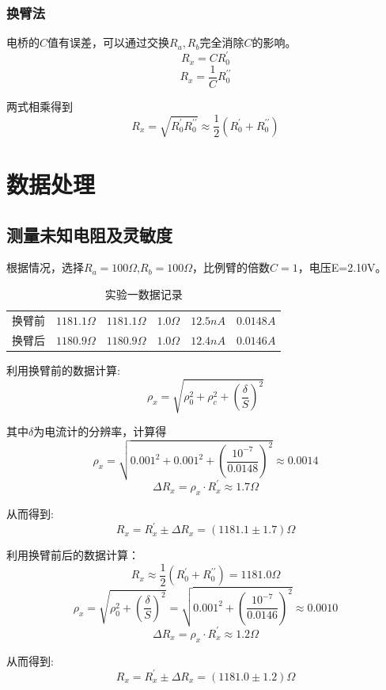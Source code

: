 \documentclass[12pt,a4paper]{article}
\begin{document}
	\subsubsection*{换臂法}
	\par 电桥的$C$值有误差，可以通过交换$R_a,R_b$完全消除$C$的影响。
	\[R_x=CR_0^{\prime}\]
	\[R_x=\frac{1}{C}R_0^{\prime\prime}\]
	\par 两式相乘得到
	$$R_x=\sqrt{R_0^{\prime}R_0^{\prime\prime}}\approx \frac{1}{2}(R_0^{\prime}+R_0^{\prime\prime})$$
	
	
	\section{数据处理}
	\subsection{测量未知电阻及灵敏度}
	\par 根据情况，选择$R_a=100\Omega$,$R_b=100\Omega$，比例臂的倍数$C=1$，电压E=2.10V。
	\begin{table}[!htbp]
		\renewcommand{\arraystretch}{1.5}
		\centering
		\caption{实验一数据记录}
		\begin{tabular}{cccccc}
			\toprule
			\makebox[0.18\textwidth][c]{电桥状态} & \makebox[0.13\textwidth][c]{$R_0$}& \makebox[0.13\textwidth][c]{$R_1$}& \makebox[0.13\textwidth][c]{$\Delta R_0$}& \makebox[0.13\textwidth][c]{$\Delta I$}& \makebox[0.13\textwidth][c]{$S_1$}\\
			\midrule
			换臂前& $1181.1\Omega$&  $1181.1\Omega$& $1.0\Omega$&$12.5nA$ & $0.0148A$\\
			换臂后& $1180.9\Omega$&  $1180.9\Omega$& $1.0\Omega$&$12.4nA$ & $0.0146A$\\
		\bottomrule		
		\end{tabular}
	\end{table}
	\clearpage
	\par 利用换臂前的数据计算:
	\[\rho_x=\sqrt{\rho_0^2+\rho_c^2+\left(\frac{\delta}{S}\right)^2}\]
	\par 其中$\delta$为电流计的分辨率，计算得
	\[\rho_x=\sqrt{0.001^2+0.001^2+\left(\frac{10^{-7}}{0.0148}\right)^2}\approx0.0014\]
	\[ \Delta R_x = \rho_x\cdot R_{x}^{\prime}\approx 1.7\Omega\]
	\par 从而得到:
	\[ R_x = R_{x}^{\prime}\pm \Delta R_x=(1181.1\pm 1.7) \Omega\]
	\par 利用换臂前后的数据计算：
	\[R_x\approx \frac{1}{2}(R_0^{\prime}+R_0^{\prime\prime})=1181.0\Omega\]
	\[\rho_x=\sqrt{\rho_0^2+\left(\frac{\delta}{S}\right)^2}=\sqrt{0.001^2+\left(\frac{10^{-7}}{0.0146}\right)^2}\approx0.0010\]
	\[ \Delta R_x = \rho_x\cdot R_{x}^{\prime}\approx 1.2\Omega\]
	\par 从而得到:
	\[ R_x = R_{x}^{\prime}\pm \Delta R_x=(1181.0\pm 1.2) \Omega\]
\end{document}
